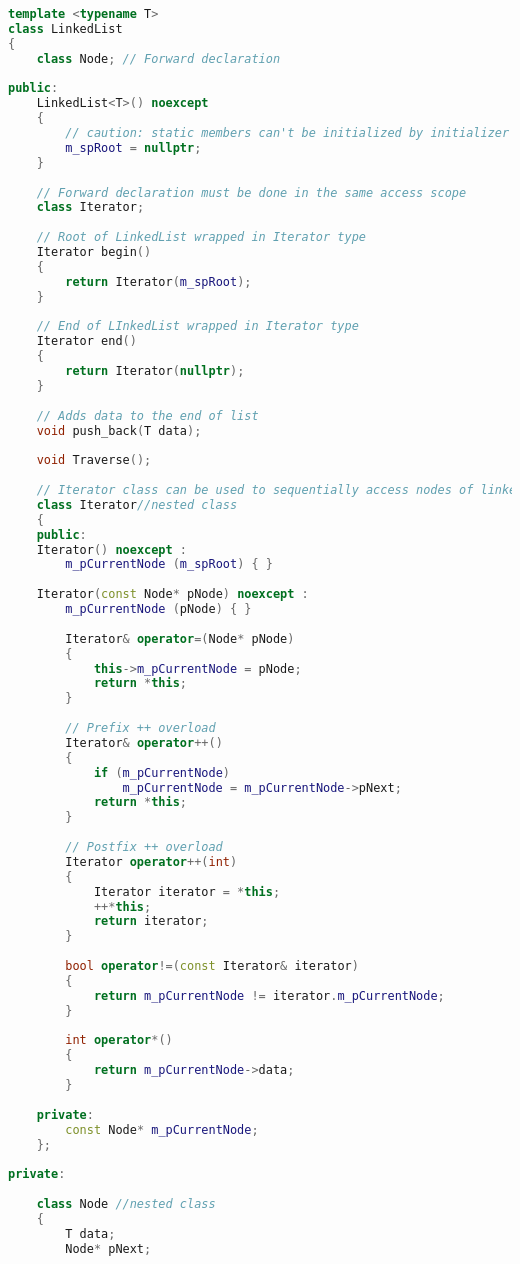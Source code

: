 \documentclass{book}
\begin{document}
\begin{lstlisting}[caption={Iterator Pattern Example 3 Signly linked list with interator},language=C++]
template <typename T> 
class LinkedList 
{ 
    class Node; // Forward declaration 
  
public: 
    LinkedList<T>() noexcept 
    { 
        // caution: static members can't be initialized by initializer list 
        m_spRoot = nullptr; 
    } 
  
    // Forward declaration must be done in the same access scope 
    class Iterator; 
  
    // Root of LinkedList wrapped in Iterator type 
    Iterator begin() 
    { 
        return Iterator(m_spRoot); 
    } 
  
    // End of LInkedList wrapped in Iterator type 
    Iterator end() 
    { 
        return Iterator(nullptr); 
    } 
  
    // Adds data to the end of list 
    void push_back(T data); 
  
    void Traverse(); 
  
    // Iterator class can be used to sequentially access nodes of linked list 
    class Iterator//nested class 
    { 
    public: 
    Iterator() noexcept : 
        m_pCurrentNode (m_spRoot) { } 
  
    Iterator(const Node* pNode) noexcept : 
        m_pCurrentNode (pNode) { } 
  
        Iterator& operator=(Node* pNode) 
        { 
            this->m_pCurrentNode = pNode; 
            return *this; 
        } 
  
        // Prefix ++ overload 
        Iterator& operator++() 
        { 
            if (m_pCurrentNode) 
                m_pCurrentNode = m_pCurrentNode->pNext; 
            return *this; 
        } 
  
        // Postfix ++ overload 
        Iterator operator++(int) 
        { 
            Iterator iterator = *this; 
            ++*this; 
            return iterator; 
        } 
  
        bool operator!=(const Iterator& iterator) 
        { 
            return m_pCurrentNode != iterator.m_pCurrentNode; 
        } 
  
        int operator*() 
        { 
            return m_pCurrentNode->data; 
        } 
  
    private: 
        const Node* m_pCurrentNode; 
    }; 
  
private: 
  
    class Node //nested class 
    { 
        T data; 
        Node* pNext; 
  

\end{lstlisting}
\end{document}
